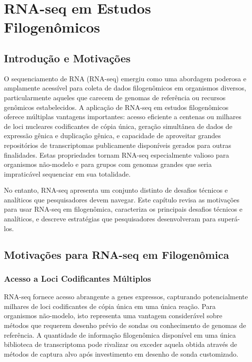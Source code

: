 
\chapter{RNA-seq em Estudos Filogenômicos}

\section{Introdução e Motivações}

O sequenciamento de RNA (RNA-seq) emergiu como uma abordagem poderosa e amplamente acessível para coleta de dados filogenômicos em organismos diversos, particularmente aqueles que carecem de genomas de referência ou recursos genômicos estabelecidos. A aplicação de RNA-seq em estudos filogenômicos oferece múltiplas vantagens importantes: acesso eficiente a centenas ou milhares de loci nucleares codificantes de cópia única, geração simultânea de dados de expressão gênica e duplicação gênica, e capacidade de aproveitar grandes repositórios de transcriptomas publicamente disponíveis gerados para outras finalidades. Estas propriedades tornam RNA-seq especialmente valioso para organismos não-modelo e para grupos com genomas grandes que seria impraticável sequenciar em sua totalidade.

No entanto, RNA-seq apresenta um conjunto distinto de desafios técnicos e analíticos que pesquisadores devem navegar. Este capítulo revisa as motivações para usar RNA-seq em filogenômica, caracteriza os principais desafios técnicos e analíticos, e descreve estratégias que pesquisadores desenvolveram para superá-los.

\section{Motivações para RNA-seq em Filogenômica}

\subsection{Acesso a Loci Codificantes Múltiplos}

RNA-seq fornece acesso abrangente a genes expressos, capturando potencialmente milhares de loci codificantes de cópia única em uma única reação. Para organismos não-modelo, isto representa uma vantagem considerável sobre métodos que requerem desenho prévio de sondas ou conhecimento de genomas de referência. A quantidade de informação filogenômica disponível em uma única biblioteca de transcriptoma pode rivalizar ou exceder aquela obtida através de métodos de captura alvo após investimento em desenho de sonda customizado.


